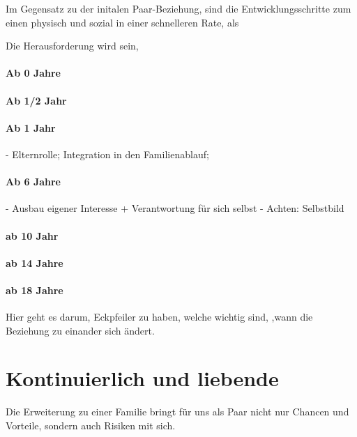 \begin{itemize}
Im Gegensatz zu der initalen Paar-Beziehung, sind die Entwicklungsschritte zum einen physisch und sozial in einer schnelleren Rate, als

Die Herausforderung wird sein, 


\paragraph{Ab 0 Jahre}
\paragraph{Ab 1/2 Jahr}
\paragraph{Ab 1 Jahr}
- Elternrolle; Integration in den Familienablauf; 
\paragraph{Ab 6 Jahre}
- Ausbau eigener Interesse + Verantwortung für sich selbst
- Achten: Selbstbild
\paragraph{ab 10 Jahr}
\paragraph{ab 14 Jahre}
\paragraph{ab 18 Jahre}






Hier geht es darum, Eckpfeiler zu haben, welche wichtig sind, ,wann die Beziehung zu einander sich ändert.

\section{Kontinuierlich und liebende}
Die Erweiterung zu einer Familie bringt für uns als Paar nicht nur Chancen und Vorteile, sondern auch Risiken mit sich.\\



\end{itemize}

